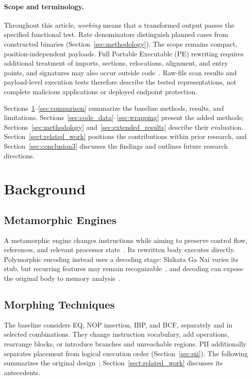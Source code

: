 \documentclass[runningheads]{llncs}
\begin{document}
\paragraph{Scope and terminology.}\label{par:study_scope}
Throughout this article, \emph{working} means that a transformed output
passes the specified functional test. Rate denominators distinguish
planned cases from constructed binaries (Section~\ref{sec:methodology}).
The scope remains compact, position-independent payloads. Full Portable
Executable (PE) rewriting requires additional treatment of imports,
sections, relocations, alignment, and entry points, and signatures may
also occur outside code~\cite{sigdetPEnoncode}. Raw-file scan results and
payload-level execution tests therefore describe the tested representations,
not complete malicious applications or deployed endpoint protection.

Sections~\ref{sec:background}--\ref{sec:comparison} summarize the baseline
methods, results, and limitations. Sections~\ref{sec:code_data}--\ref{sec:wrapping}
present the added methods; Sections~\ref{sec:methodology} and~\ref{sec:extended_results}
describe their evaluation. Section~\ref{sect:related_work} positions the
contributions within prior research, and Section~\ref{sec:conclusion3}
discusses the findings and outlines future research directions.

\section{Background}\label{sec:background}

\subsection{Metamorphic Engines}\label{sub:meth}
A metamorphic engine changes instructions while aiming to preserve
control flow, references, and relevant processor
state~\cite{historycodeobf,identifyingmeth,metworm}. Its rewritten body
executes directly. Polymorphic encoding instead uses a decoding stage:
Shikata Ga Nai varies its stub, but recurring features may remain
recognizable~\cite{sgnstrong}, and decoding can expose the original body
to memory analysis~\cite{codeExtraction}.

\subsection{Morphing Techniques}
The baseline considers EQ, NOP insertion, IBP, and BCF, separately and in
selected combinations. They change instruction vocabulary, add operations,
rearrange blocks, or introduce branches and unreachable regions.
PII additionally separates placement from logical execution order
(Section~\ref{sec:pii}). The following summarizes the original
design~\cite{zone_secrypt_2026}; Section~\ref{sect:related_work} discusses
its antecedents.
\end{document}
